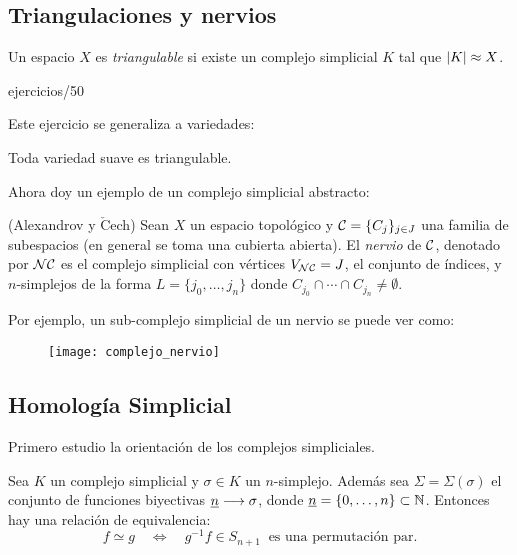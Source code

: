 \documentclass[../../topologia_algebraica]{subfiles}
\begin{document}
\subsection{Triangulaciones y nervios}

\begin{defin}
  Un espacio $X$ es \emph{triangulable} si existe un complejo simplicial $K$ tal que
  $\left| K \right|\approx X$.
\end{defin}

{ejercicios/50} %

Este ejercicio se generaliza a variedades:

\begin{thm}
  Toda variedad suave es triangulable.
\end{thm}

Ahora doy un ejemplo de un complejo simplicial abstracto:

\begin{defin}(Alexandrov y $\check{\text{C}}$ech)
  Sean $X$ un espacio topol\'ogico y $\mathcal{C}=\{C_j\}_{j\in J}$ una familia de subespacios (en general
  se toma una cubierta abierta). El \emph{nervio} de $\mathcal{C}$, denotado por $\mathcal{N}\mathcal{C}$ es el complejo
  simplicial con v\'ertices $V_{\mathcal{N}\mathcal{C}}=J$, el conjunto de \'indices, y $n$-simplejos de la forma
  $L=\{j_0,\ldots,j_n\}$ donde $C_{j_0}\cap\cdots\cap C_{j_n}\neq\emptyset$.
\end{defin}

Por ejemplo, un sub-complejo simplicial de un nervio se puede ver como:

\begin{figure}[h!]%
  \centering
  \texttt{[image: complejo\_nervio]}
\end{figure}%






\subsection{Homolog\'ia Simplicial}

Primero estudio la orientaci\'on de los complejos simpliciales.

\begin{defin}
  Sea $K$ un complejo simplicial y $\sigma\in K$ un $n$-simplejo. Adem\'as sea $\Sigma=\Sigma(\sigma)$
  el conjunto de funciones biyectivas $\underline{n}\longrightarrow\sigma$, donde
  $\underline{n}=\{0,\ldots,n\}\subset\mathbb{N}$. Entonces hay una relaci\'on de equivalencia:
  \[
    f \simeq g \quad\iff\quad g^{-1}f\in S_{n+1}\;\;\text{es una permutaci\'on par.}
  \]
\end{defin}
\end{document}
